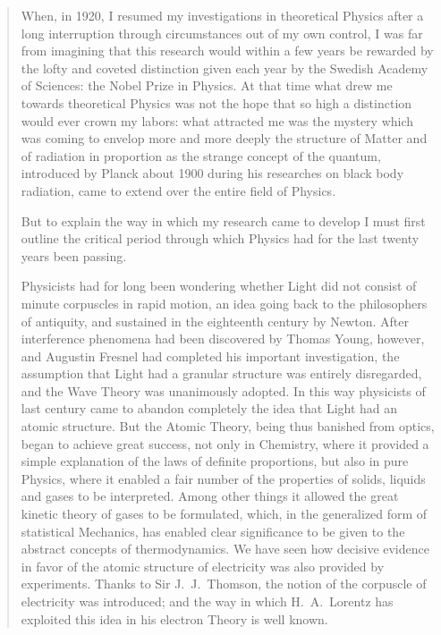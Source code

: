 \begin{quotation}
When, in 1920, I resumed my investigations in theoretical Physics after
a long interruption through circumstances out of my own control, I was
far from imagining that this research would within a few years be
rewarded by the lofty and coveted distinction given each year by the
Swedish Academy of Sciences: the Nobel Prize in Physics. At that time
what drew me towards theoretical Physics was not the hope that so high a
distinction would ever crown my labors: what attracted me was the
mystery which was coming to envelop more and more deeply the structure
of Matter and of radiation in proportion as the strange concept of the
quantum, introduced by Planck about 1900 during his researches on black
body radiation, came to extend over the entire field of Physics.

But to explain the way in which my research came to develop I must first
outline the critical period through which Physics had for the last
twenty years been passing.

Physicists had for long been wondering whether Light did not consist of
minute corpuscles in rapid motion, an idea going back to the
philosophers of antiquity, and sustained in the eighteenth century by
Newton. After interference phenomena had been discovered by Thomas
Young, however, and Augustin Fresnel had completed his important
investigation, the assumption that Light had a granular structure was
entirely disregarded, and the Wave Theory was unanimously adopted. In
this way physicists of last century came to abandon completely the idea
that Light had an atomic structure. But the Atomic Theory, being thus
banished from optics, began to achieve great success, not only in
Chemistry, where it provided a simple explanation of the laws of
definite proportions, but also in pure Physics, where it enabled a fair
number of the properties of solids, liquids and gases to be interpreted.
Among other things it allowed the great kinetic theory of gases to be
formulated, which, in the generalized form of statistical Mechanics, has
enabled clear significance to be given to the abstract concepts of
thermodynamics. We have seen how decisive evidence in favor of the
atomic structure of electricity was also provided by experiments. Thanks
to Sir J.\ J.\ Thomson, the notion of the corpuscle of electricity was
introduced; and the way in which H.\ A.\ Lorentz has exploited this idea
in his electron Theory is well known.


\end{quotation}

